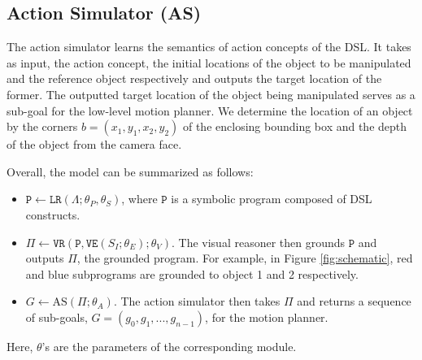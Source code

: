 \subsection{Action Simulator (AS)}
\label{subsec:action-simulator}
The action simulator learns the semantics of action concepts of the DSL. It takes as input, the action concept, the initial locations  of the object to be manipulated and the reference object respectively and outputs the target location of the former. The outputted target location of the object being manipulated serves as a sub-goal for the low-level motion planner. We determine the location of an object by the corners $b = (x_1,y_1,x_2,y_2)$ of the enclosing bounding box and the depth of the object from the camera face. 

\noindent  
Overall, the model can be summarized as follows:
\begin{itemize}
    \item $\mathtt{P} \leftarrow \mathtt{LR}(\Lambda; \theta_P, \theta_S)$, where $\mathtt{P}$ is a symbolic program composed of DSL constructs. 
    \item $\Pi \leftarrow \mathtt{VR}(\mathtt{P}, \mathtt{VE}(S_I;\theta_E);\theta_V)$. The visual reasoner then grounds $\texttt{P}$ and outputs $\Pi$, the grounded program. For example, in Figure \ref{fig:schematic}, red and blue subprograms are grounded to object 1 and 2 respectively.
    \item $G \leftarrow \text{AS}(\Pi; \theta_A)$. The action simulator then takes $\Pi$ and returns a sequence of sub-goals, $G = (g_0, g_1, ..., g_{n-1})$, for the motion planner.
\end{itemize}
Here, $\theta$'s are the parameters of the corresponding  module. 

